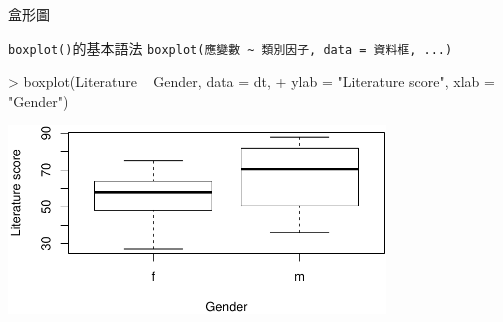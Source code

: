 \documentclass[14pt, aspectratio=43]{beamer}
\begin{document}
\begin{frame}[fragile]{盒形圖}

\begin{block}{\texttt{boxplot()}的基本語法}
\verb+boxplot(應變數 ~ 類別因子, data = 資料框, ...)+
\end{block}

\begin{RC}
> boxplot(Literature ~ Gender, data = dt, 
+         ylab = "Literature score", xlab = "Gender")
\end{RC}

\begin{center}
\includegraphics[width=0.75\textwidth]{Rplot-two-group.pdf}
\end{center}
\end{frame}

\end{document}
